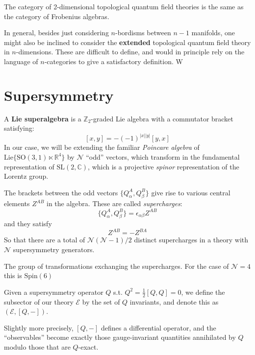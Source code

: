 	\begin{theorem}
		The category of 2-dimensional topological quantum field theories is the same as the category of Frobenius algebras.
	\end{theorem}
	
	In general, besides just considering $n$-bordisms between $n-1$ manifolds, one might also be inclined to consider the  \textbf{extended} topological quantum field theory in $n$-dimensions.
	These are difficult to define, and would in principle rely on the language of $n$-categories to give a satisfactory definition. W 
		
	

	\section{Supersymmetry} %
	\label{sec:supersymmetry}

	\begin{defn}
	A \textbf{Lie superalgebra} is a $\mathbb Z_2$-graded Lie algebra with a commutator bracket satisfying:
		$$[x, y]= -(-1)^{|x||y|} [y, x]$$
		In our case, we will be extending the familiar \emph{Poincare algebra} of $\mathrm{Lie}\{ \mathrm{SO}(3, 1) \ltimes \mathbb R^4  \}$ by $\mathcal N$ ``odd'' vectors, which transform in the fundamental representation of $\mathrm{SL(2, \mathbb C)}$, which is a projective \emph{spinor} representation of the Lorentz group. 
	\end{defn}
	The brackets between the odd vectors $\{Q^A_\alpha, Q^B_\beta \} $ give rise to various central elements $Z^{AB}$ in the algebra. These are called \emph{supercharges}:
	$$\{Q^A_\alpha, Q^B_\beta \} = \epsilon_{\alpha \beta} Z^{AB}$$
	and they satisfy
	$$Z^{AB} = -Z^{BA}$$
	So that there are a total of $\mathcal N (\mathcal N - 1)/2$ distinct supercharges in a theory with $\mathcal N$ supersymmetry generators. 
	\begin{defn}
		The group of transformations exchanging the supercharges. For the case of $\mathcal N = 4$ this is $\mathrm{Spin}(6)$
	\end{defn}
	
	\begin{defn}[Subsector]
		Given a supersymmetry operator $Q$ s.t. $Q^2 = \frac{1}{2} [Q, Q] = 0$, we define the subsector of our theory $\mathcal E$ by the set of $Q$ invariants, and denote this as $(\mathcal E, [Q, -])$.
		
		Slightly more precisely, $[Q, -]$ defines a differential operator, and the ``observables'' become exactly those gauge-invariant quantities annihilated by $Q$ modulo those that are $Q$-exact.
	\end{defn}

	